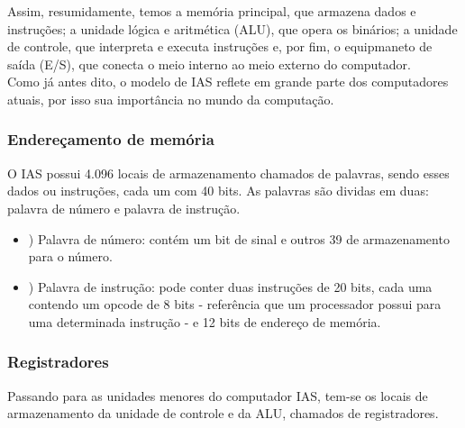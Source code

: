 \documentclass{article}
\begin{document}
Assim, resumidamente, temos a memória principal, que armazena dados e
instruções; a unidade lógica e aritmética (ALU), que opera os binários; a
unidade de controle, que interpreta e executa instruções e, por fim, o
equipmaneto de saída (E/S), que conecta o meio interno ao meio externo do
computador. \\

Como já antes dito, o modelo de IAS reflete em grande parte dos computadores atuais, por isso sua importância no mundo da computação.

\subsubsection{Endereçamento de memória}
O IAS possui 4.096 locais de armazenamento chamados de palavras, sendo esses dados ou instruções, cada um com 40 bits. As palavras são dividas em duas: palavra de número e palavra de instrução. \\

\begin{itemize}
	\item{}) Palavra de número: contém um bit de sinal e outros 39 de armazenamento para o número. \\
	\item{}) Palavra de instrução: pode conter duas instruções de 20 bits, cada uma contendo um opcode de 8 bits - referência que um processador possui para uma determinada instrução - e 12 bits de endereço de memória.
\end{itemize}


\subsubsection{Registradores}
Passando para as unidades menores do computador IAS, tem-se os locais de armazenamento da unidade de controle e da ALU, chamados de registradores.
\end{document}
